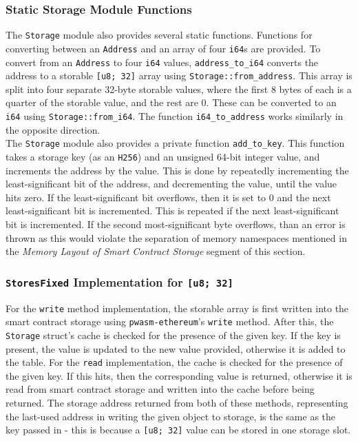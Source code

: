 \subsubsection{Static Storage Module Functions}

The \texttt{Storage} module also provides several static functions. Functions for converting between an \texttt{Address} and an array of four \texttt{i64}s are provided. To convert from an \texttt{Address} to four \texttt{i64} values, \texttt{address\_to\_i64} converts the address to a storable \texttt{[u8; 32]} array using \texttt{Storage::from\_address}. This array is split into four separate 32-byte storable values, where the first 8 bytes of each is a quarter of the storable value, and the rest are 0. These can be converted to an \texttt{i64} using \texttt{Storage::from\_i64}. The function \texttt{i64\_to\_address} works similarly in the opposite direction. \\

The \texttt{Storage} module also provides a private function \texttt{add\_to\_key}. This function takes a storage key (as an \texttt{H256}) and an unsigned 64-bit integer value, and increments the address by the value. This is done by repeatedly incrementing the least-significant bit of the address, and decrementing the value, until the value hits zero. If the least-significant bit overflows, then it is set to 0 and the next least-significant bit is incremented. This is repeated if the next least-significant bit is incremented. If the second most-significant byte overflows, than an error is thrown as this would violate the separation of memory namespaces mentioned in the \textit{Memory Layout of Smart Contract Storage} segment of this section.


\subsubsection{\texttt{StoresFixed} Implementation for \texttt{[u8; 32]}}

For the \texttt{write} method implementation, the storable array is first written into the smart contract storage using \texttt{pwasm-ethereum}'s \texttt{write} method. After this, the \texttt{Storage} struct's cache is checked for the presence of the given key. If the key is present, the value is updated to the new value provided, otherwise it is added to the table. For the \texttt{read} implementation, the cache is checked for the presence of the given key. If this hits, then the corresponding value is returned, otherwise it is read from smart contract storage and written into the cache before being returned. The storage address returned from both of these methods, representing the last-used address in writing the given object to storage, is the same as the key passed in - this is because a \texttt{[u8; 32]} value can be stored in one storage slot. \\


